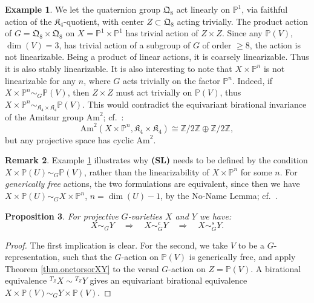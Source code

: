 \documentclass[12pt, reqno]{amsart}
\numberwithin{equation}{section}
\theoremstyle{plain}
\newtheorem{prop}{Proposition}[section]
\theoremstyle{definition}
\newtheorem{exam}[prop]{Example}
\newtheorem{rema}[prop]{Remark}
\def\bP{{\mathbb P}}
\def\bZ{{\mathbb Z}}
\begin{document}
\begin{exam}
\label{exa.Q8Q8}
We let the quaternion group $\mathfrak{Q}_8$ act linearly on $\bP^1$, via faithful action of the $\mathfrak{K}_4$-quotient, with center $Z\subset \mathfrak{Q}_8$ acting trivially.
The product action of $G=\mathfrak{Q}_8\times \mathfrak{Q}_8$ on $X=\bP^1\times \bP^1$ has trivial action of $Z\times Z$.
Since any $\bP(V)$, $\dim(V)=3$, has trivial action of a subgroup of $G$ of order $\ge 8$, the action is not linearizable.
Being a product of linear actions, it is coarsely linearizable.
Thus it is also stably linearizable.
It is also interesting to note that $X\times \bP^n$ is not linearizable for any $n$, where $G$ acts trivially on the factor $\bP^n$.
Indeed, if $X\times \bP^n\sim_G \bP(V)$,
then $Z\times Z$ must act trivially on $\bP(V)$, thus $X\times\bP^n\sim_{\mathfrak{K}_4\times \mathfrak{K}_4}\bP(V)$.
This would contradict the
equivariant birational invariance of the Amitsur group $\mathrm{Am}^2$; cf.\ \cite[Sect.\ 5]{KTsurvey}:
$$
\mathrm{Am}^2(X\times \bP^n,\mathfrak{K}_4\times \mathfrak{K}_4)\cong \bZ/2\bZ\oplus \bZ/2\bZ,
$$
but any projective space has cyclic $\mathrm{Am}^2$.
\end{exam}

\begin{rema}
\label{rem.SLwhy}
Example \ref{exa.Q8Q8} illustrates why \textbf{(SL)} needs to be defined by the condition $X\times \bP(U) \sim_G \bP(V)$, rather than the linearizability of $X\times \bP^n$ for some $n$.
For \emph{generically free} actions, the two formulations are equivalent, since then we have
$X\times \bP(U) \sim_G X\times \bP^n$, $n=\dim(U)-1$,
by the No-Name Lemma; cf.\ \cite[\S 3.5]{KTsurvey}.
\end{rema}

\begin{prop}
\label{prop.implicationsXY}
For projective $G$-varieties $X$ and $Y$ we have:
\[ X\sim_GY\quad\Rightarrow\quad X\sim_G^cY\quad\Rightarrow\quad X\sim_G^sY. \]
\end{prop}

\begin{proof}
The first implication is clear.
For the second, we take $V$ to be a $G$-representation, such that the $G$-action on $\bP(V)$ is generically free,
and apply Theorem \ref{thm.onetorsorXY} to the versal $G$-action on $Z=\bP(V)$.
A birational equivalence
${}^{T_Z}X\sim {}^{T_Z}Y$ gives an equivariant birational equivalence
$X\times \bP(V)\sim_G Y\times \bP(V)$.
\end{proof}
\end{document}

